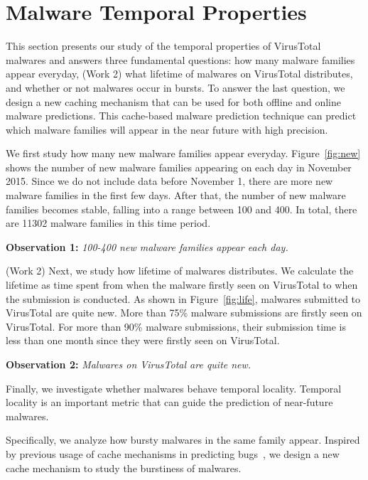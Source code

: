 \section{Malware Temporal Properties}
\label{sec:temporal}

This section presents our study of the temporal properties of VirusTotal malwares
and answers three fundamental questions: 
how many malware families appear everyday, 
{\color{red} (Work 2)
what lifetime of malwares on VirusTotal distributes,  
}
and whether or not malwares occur in bursts.
To answer the last question, we design a new caching mechanism 
that can be used for both offline and online malware predictions.
This cache-based malware prediction technique can predict which malware families will appear in the near future with high precision.



We first study how many new malware families appear everyday. 
Figure~\ref{fig:new} shows the number of new malware families appearing on each day in November 2015. 
Since we do not include data before November 1, 
there are more new malware families in the first few days.
After that, the number of new malware families becomes stable, 
falling into a range between 100 and 400. 
In total, there are 11302 malware families in this time period. 

{\bf Observation 1:} 
{\em 100-400 new malware families appear each day.}

%
%


{\color{red} (Work 2)
Next, we study how lifetime of malwares distributes. 
We calculate the lifetime as time spent from when the malware firstly seen on VirusTotal to when the submission is conducted.   
As shown in Figure~\ref{fig:life}, malwares submitted to VirusTotal are quite new. 
More than 75\% malware submissions are firstly seen on VirusTotal.
For more than 90\% malware submissions, 
their submission time is less than one month since they were firstly seen on VirusTotal. 

{\bf Observation 2:}
{\em Malwares on VirusTotal are quite new. }

}


Finally, we investigate whether malwares behave temporal locality.
Temporal locality is an important metric that can guide the 
prediction of near-future malwares.

Specifically, we analyze how bursty malwares in the same family appear.  
Inspired by previous usage of cache mechanisms in predicting bugs~\cite{predicting},
we design a new cache mechanism to study the burstiness of malwares.

